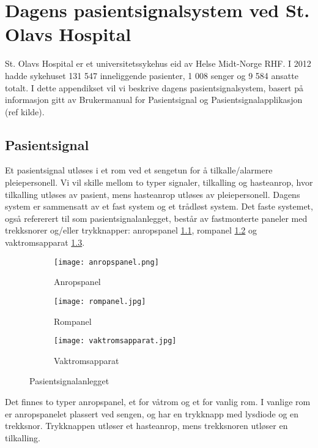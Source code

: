 \chapter{Dagens pasientsignalsystem ved St. Olavs Hospital}
\label{appendix_dagenssystem}

St. Olavs Hospital er et universitetssykehus eid av Helse Midt-Norge RHF. I 2012 hadde sykehuset 131 547 inneliggende pasienter, 1 008 senger og 9 584 ansatte totalt. 
I dette appendikset vil vi beskrive dagens pasientsignalsystem, basert på informasjon gitt av Brukermanual for Pasientsignal og Pasientsignalapplikasjon (ref kilde).

\section{Pasientsignal}
Et pasientsignal utløses i et rom ved et sengetun for å tilkalle/alarmere pleiepersonell.
Vi vil skille mellom to typer signaler, tilkalling og hasteanrop, hvor tilkalling utløses av pasient, mens hasteanrop utløses av pleiepersonell. 
Dagens system er sammensatt av et fast system og et trådløst system. Det faste systemet, også refererert til som pasientsignalanlegget, består av fastmonterte paneler med trekksnorer og/eller trykknapper: anropspanel \ref{anropspanel}, rompanel \ref{rompanel} og vaktromsapparat \ref{vaktromsapparat}.

\begin{figure}[H]
        \centering
        \begin{subfigure}[b]{0.3\textwidth}
        		\centering
                \texttt{[image: anropspanel.png]}
                \caption{Anropspanel}
                \label{anropspanel}
        \end{subfigure}%
        \begin{subfigure}[b]{0.3\textwidth}
        		\centering
                \texttt{[image: rompanel.jpg]}
                \caption{Rompanel}
                \label{rompanel}
        \end{subfigure}
        \begin{subfigure}[b]{0.3\textwidth}
        		\centering
                \texttt{[image: vaktromsapparat.jpg]}
                \caption{Vaktromsapparat}
                \label{vaktromsapparat}
        \end{subfigure}
        \caption{Pasientsignalanlegget}\label{pasientsignalanlegget}
\end{figure}
\noindent
Det finnes to typer anropspanel, et for våtrom og et for vanlig rom. I vanlige rom er anropspanelet plassert ved sengen, og har en trykknapp med lysdiode og en trekksnor.
Trykknappen utløser et hasteanrop, mens trekksnoren utløser en tilkalling.

